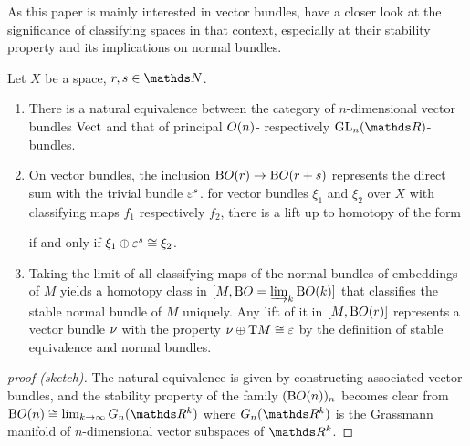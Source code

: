 As this paper is mainly interested in vector bundles, have a closer
look at the significance of classifying spaces in that context,
especially at their stability property and its implications on normal
bundles.
\begin{Lem}\label{lem:classificationvb}
  Let $X$ be a space, $r,s\in\Nat$.
  \begin{enumerate}
  \item\label{item:vbcharacterisation}
    There is a natural equivalence between the category of
    $n$-dimensional vector bundles $\mathrm{Vect}$ and that of principal
    $O(n)$- respectively $\GL n$-bundles.
  \item
    On vector bundles, the inclusion $\mathrm{B}O(r)\to\mathrm{B}O(r+s)$
    represents the direct sum with the trivial bundle $\varepsilon^s$.
    \Idest for vector bundles $\xi_1$ and $\xi_2$ over $X$ with
    classifying maps $f_1$ respectively $f_2$, there is a lift up to
    homotopy of the form
    \begin{center}
    \end{center}
    if and only if $\xi_1\oplus\varepsilon^{s}\cong\xi_2$.
  \item\label{item:charclsstablenormalbundle}
    Taking the limit of all classifying maps of the normal bundles of
    embeddings of $M$ yields a homotopy class in
    $[M,\mathrm{B}O=\varinjlim_{k}\mathrm{B}O(k)]$
    that classifies the stable normal bundle of $M$ uniquely.
    Any lift of it in $[M,\mathrm{B}O(r)]$ represents a vector bundle
    $\nu_{}$ with the property $\nu_{}\oplus\mathrm{T}M\cong\varepsilon$ by the
    definition of stable equivalence and normal bundles.
  \end{enumerate}  
  \begin{proof}[proof (sketch)]
    The natural equivalence is given by constructing associated vector
    bundles, and the stability property of the family $(\mathrm{B}O(n))_n$
    becomes clear from $\B\Orth(n)\cong\lim_{k\to\infty}G_n(\R^k)$
    where $G_n(\R^k)$ is the Grassmann manifold of $n$-dimensional
    vector subspaces of $\R^k$.
  \end{proof}
\end{Lem}

